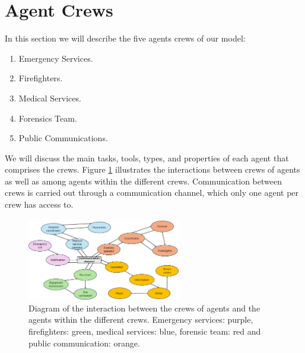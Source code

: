 \section{Agent Crews}\label{sec:agents}
In this section we will describe the five agents crews of our model:
\begin{enumerate}
    \item Emergency Services.
    \item Firefighters.
    \item Medical Services.
    \item Forensics Team.
    \item Public Communications.
\end{enumerate}
We will discuss the main tasks, tools, types, and properties of each agent that comprises the crews. Figure \ref{fig:diagram} illustrates the interactions between crews of agents as well as among agents within the different crews. Communication between crews is carried out through a communication channel, which only one agent per crew has access to.

\begin{figure}[H]
\centering
\includegraphics[width=0.6\textwidth]{../figures/diagram_between_agents.png}
\caption{Diagram of the interaction between the crews of agents and the agents within the different crews. Emergency services: purple, firefighters: green, medical services: blue, forensic team: red and public communication: orange.}
\label{fig:diagram}
\end{figure}






